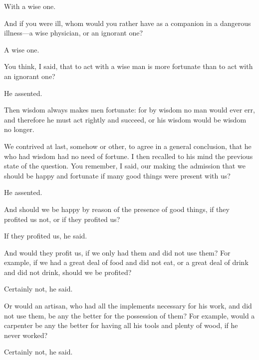 \documentclass[11pt,letter]{article}
\begin{document}
\par  With a wise one.

\par  And if you were ill, whom would you rather have as a companion in a dangerous illness—a wise physician, or an ignorant one?

\par  A wise one.

\par  You think, I said, that to act with a wise man is more fortunate than to act with an ignorant one?

\par  He assented.

\par  Then wisdom always makes men fortunate: for by wisdom no man would ever err, and therefore he must act rightly and succeed, or his wisdom would be wisdom no longer.

\par  We contrived at last, somehow or other, to agree in a general conclusion, that he who had wisdom had no need of fortune. I then recalled to his mind the previous state of the question. You remember, I said, our making the admission that we should be happy and fortunate if many good things were present with us?

\par  He assented.

\par  And should we be happy by reason of the presence of good things, if they profited us not, or if they profited us?

\par  If they profited us, he said.

\par  And would they profit us, if we only had them and did not use them? For example, if we had a great deal of food and did not eat, or a great deal of drink and did not drink, should we be profited?

\par  Certainly not, he said.

\par  Or would an artisan, who had all the implements necessary for his work, and did not use them, be any the better for the possession of them? For example, would a carpenter be any the better for having all his tools and plenty of wood, if he never worked?

\par  Certainly not, he said.
\end{document}
